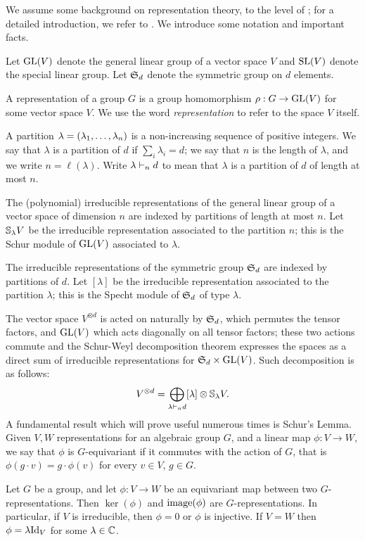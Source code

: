 We assume some background on representation theory, to the level of \cite[Ch.6]{Lan12}; for a detailed introduction, we refer to \cite{FH91}. We introduce some notation and important facts.

Let $\mathrm{GL}(V)$ denote the general linear group of a vector space $V$ and $\mathrm{SL}(V)$ denote the special linear group. Let $\mathfrak{S}_d$ denote the symmetric group on $d$ elements. 

A representation of a group $G$ is a group homomorphism $\rho : G \to \mathrm{GL}(V)$ for some vector space $V$. We use the word \emph{representation} to refer to the space $V$ itself. 

A partition $\lambda = (\lambda_1 , \ldots , \lambda_n)$ is a non-increasing sequence of positive integers. We say that $\lambda$ is a partition of $d$ if $\sum_i \lambda_i = d$; we say that $n$ is the length of $\lambda$, and we write $n = \ell(\lambda)$. Write $\lambda \vdash_n d$ to mean that $\lambda$ is a partition of $d$ of length at most $n$.

The (polynomial) irreducible representations of the general linear group of a vector space of dimension $n$ are indexed by partitions of length at most $n$. Let $\mathbb{S}_\lambda V$ be the irreducible representation associated to the partition $n$; this is the Schur module of $\mathrm{GL}(V)$ associated to $\lambda$.

The irreducible representations of the symmetric group $\mathfrak{S}_d$ are indexed by partitions of $d$. Let $[\lambda]$ be the irreducible representation associated to the partition $\lambda$; this is the Specht module of $\mathfrak{S}_d$ of type $\lambda$. 

The vector space $V^{\otimes d}$ is acted on naturally by $\mathfrak{S}_d$, which permutes the tensor factors, and $\mathrm{GL}(V)$ which acts diagonally on all tensor factors; these two actions commute and the Schur-Weyl decomposition theorem expresses the spaces as a direct sum of irreducible representations for $\mathfrak{S}_d \times \mathrm{GL}(V)$. Such decomposition is as follows:
\[
V^{\otimes d} = \bigoplus_{\lambda \vdash_n d} [\lambda] \otimes \mathbb{S}_{\lambda} V.
\]
A fundamental result which will prove useful numerous times is Schur's Lemma. Given $V,W$ representations for an algebraic group $G$, and a linear map $\phi : V \to W$, we say that $\phi$ is $G$-equivariant if it commutes with the action of $G$, that is $\phi( g \cdot v) = g \cdot \phi(v)$ for every $v \in V$, $g \in G$.
\begin{lemma}
\label{repTheory-lemma-Schur}
Let $G$ be a group, and let $\phi : V \to W$ be an equivariant map between two $G$-representations. Then $\ker(\phi)$ and $\mathrm{image}(\phi)$ are $G$-representations. In particular, if $V$ is irreducible, then $\phi = 0$ or $\phi$ is injective. If $V= W$ then $\phi = \lambda \mathrm{Id}_V$ for some $\lambda \in \mathbb{C}$.
\end{lemma}

